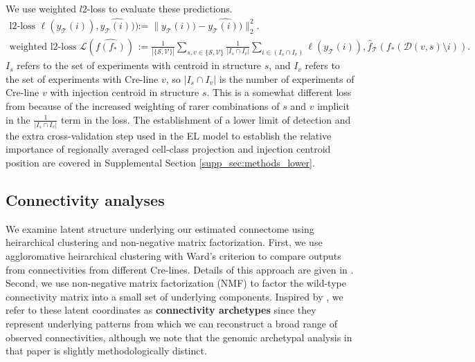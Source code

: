We use weighted $l2$-loss to evaluate these predictions.
\begin{align*}
\text{l2-loss } \ell (y_{\mathcal T}(i)),\widehat {y_{\mathcal T}(i))}) &:=   \| y_{\mathcal T} (i)) - \widehat {y_{\mathcal T}(i))} \|_2^2. \\
\text{weighted l2-loss } \mathcal L ( \widehat {f(f_*)}) &:= \frac{1}{|\{\mathcal S,\mathcal V\}|} \sum_{s,v \in \{\mathcal S,\mathcal V\}} \frac{1}{ |I_{s} \cap I_v |} \sum_{i \in (I_{s} \cap I_v ) } \ell (y_{\mathcal T}(i)), \hat f_{\mathcal T} (f_*(\mathcal D(v,s) \setminus i)) .
\end{align*}
$I_s$ refers to the set of experiments with centroid in structure $s$, and $I_v$ refers to the set of experiments with Cre-line $v$, so $|I_s \cap I_v|$ is the number of experiments of Cre-line $v$ with injection centroid in structure $s$.
This is a somewhat different loss from \citet{Knox2019-ot} because of the increased weighting of rarer combinations of $s$ and $v$ implicit in the $\frac{1}{ |I_{s} \cap I_v |}$ term in the loss.
The establishment of a lower limit of detection and the extra cross-validation step used in the EL model to establish the relative importance of regionally averaged cell-class projection and injection centroid position are covered in Supplemental Section \ref{supp_sec:methods_lower}.

\newpage

\subsection{Connectivity analyses}

We examine latent structure underlying our estimated connectome using heirarchical clustering and non-negative matrix factorization.
First, we use aggloromative heirarchical clustering with Ward's criterion to compare outputs from connectivities from different Cre-lines.
Details of this approach are given in \citet{Hastie_2009, Lalloue2013-is}.
Second, we use non-negative matrix factorization (NMF) to factor the wild-type connectivity matrix into a small set of underlying components.
Inspired by \citet{Mohammadi2018-te}, we refer to these latent coordinates as \textbf{connectivity archetypes} since they represent underlying patterns from which we can reconstruct a broad range of observed connectivities, although we note that the genomic archetypal analysis in that paper is slightly methodologically distinct.

